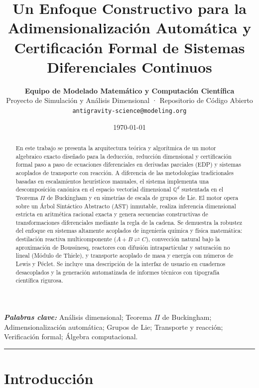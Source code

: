\documentclass[11pt,a4paper]{article}
\title{\textbf{\LARGE Un Enfoque Constructivo para la Adimensionalización Automática y Certificación Formal de Sistemas Diferenciales Continuos}}
\author{
    \textbf{Equipo de Modelado Matemático y Computación Científica}\\[1ex]
    \small Proyecto de Simulación y Análisis Dimensional · Repositorio de Código Abierto\\
    \small \texttt{antigravity-science@modeling.org}
}
\date{\today}
\theoremstyle{definition}
\theoremstyle{plain}
\theoremstyle{remark}
\begin{document}
\maketitle

\begin{abstract}
En este trabajo se presenta la arquitectura teórica y algorítmica de un motor algebraico exacto diseñado para la deducción, reducción dimensional y certificación formal paso a paso de ecuaciones diferenciales en derivadas parciales (EDP) y sistemas acoplados de transporte con reacción. A diferencia de las metodologías tradicionales basadas en escalamientos heurísticos manuales, el sistema implementa una descomposición canónica en el espacio vectorial dimensional $\mathbb{Q}^d$ sustentada en el Teorema $\Pi$ de Buckingham y en simetrías de escala de grupos de Lie. El motor opera sobre un Árbol Sintáctico Abstracto (AST) inmutable, realiza inferencia dimensional estricta en aritmética racional exacta y genera secuencias constructivas de transformaciones diferenciales mediante la regla de la cadena. Se demuestra la robustez del enfoque en sistemas altamente acoplados de ingeniería química y física matemática: destilación reactiva multicomponente ($A+B \rightleftharpoons C$), convección natural bajo la aproximación de Boussinesq, reactores con difusión intraparticular y saturación no lineal (Módulo de Thiele), y transporte acoplado de masa y energía con números de Lewis y Péclet. Se incluye una descripción de la interfaz de usuario en cuadernos desacoplados y la generación automatizada de informes técnicos con tipografía científica rigurosa.
\end{abstract}

\textbf{\textit{Palabras clave:}} Análisis dimensional; Teorema $\Pi$ de Buckingham; Adimensionalización automática; Grupos de Lie; Transporte y reacción; Verificación formal; Álgebra computacional.

\vspace{1.5em}
\hrule
\vspace{1.5em}

\section{Introducción}
\end{document}
